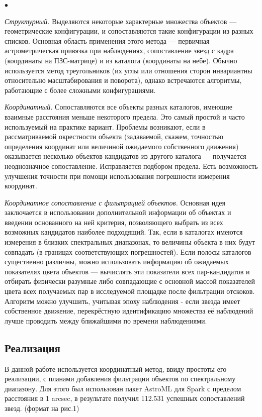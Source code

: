 \documentclass[12pt, a4paper]{article}
\newenvironment{compactlist}{
    \begin{list}{{$\bullet$}}{
      \setlength\partopsep{0pt}
      \setlength\parskip{0pt}
      \setlength\parsep{0pt}
      \setlength\topsep{0pt}
      \setlength\itemsep{0pt}
} }{
\end{list} }
\begin{document}
	\begin{compactlist}
		\item {\itshape Структурный.} Выделяются некоторые характерные множества объектов — геометрические конфигурации, и сопоставляются такие конфигурации из разных списков. Основная область применения этого метода — первичная астрометрическая привязка при наблюдениях, сопоставление звезд с кадра (координаты на ПЗС-матрице) и из каталога (координаты на небе). Обычно используется метод треугольников (их углы или отношения сторон инвариантны относительно масштабирования и поворота), однако встречаются алгоритмы, работающие с более сложными конфигурациями.
		\item {\itshape Координатный.} Сопоставляются все объекты разных каталогов, имеющие взаимные расстояния меньше некоторого предела. Это самый простой и часто используемый на практике вариант. Проблемы возникают, если в рассматриваемой окрестности объекта (задаваемой, скажем, точностью определения координат или величиной ожидаемого собственного движения) оказывается несколько объектов-кандидатов из другого каталога — получается неоднозначное сопоставление. Исправляется подбором предела. Есть возможность улучшения точности при помощи использования погрешности измерения координат.
		\item {\itshape Координатное сопоставление с фильтрацией объектов.} Основная идея заключается в использовании дополнительной информации об объектах и введении основанного на ней критерия, позволяющего выбрать из всех возможных кандидатов наиболее подходящий. Так, если в каталогах имеются измерения в близких спектральных диапазонах, то величины объекта в них будут совпадать (в границах соответствующих погрешностей). Если полосы каталогов существенно различны, можно использовать информацию об ожидаемых показателях цвета объектов — вычислять эти показатели всех пар-кандидатов и отбирать физически разумные либо совпадающие с основной массой показателей цвета всех получаемых пар в исследуемой площадке после фильтрации отскоков. Алгоритм можно улучшить, учитывая эпоху наблюдения - если звезда имеет собственное движение, перекрёстную идентификацию множества её наблюдений лучше проводить между ближайшими по времени наблюдениями.
	\end{compactlist}
	\subsection*{Реализация}
	В данной работе используется координатный метод, ввиду простоты его реализации, с планами добавления фильтрации объектов по спектральному диапазону. Для этого был использован пакет AstroML для Spark с пределом расстояния в 1 arcsec, в результате получил 112.531 успешных сопоставлений звезд. (формат на рис.1)
\end{document}
